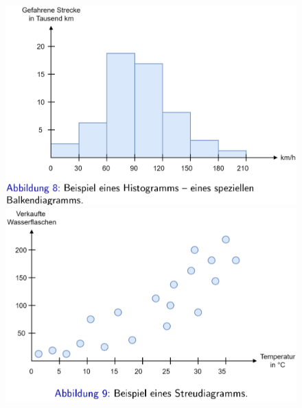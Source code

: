 \documentclass{report}
\begin{document}
  \begin{figure}[H]	
    \centering	
    \begin{minipage}[b]{0.4\textwidth}	
      \includegraphics[scale=.25]{ml01_6}	
    \end{minipage}	
    \hfill	
    \begin{minipage}[b]{0.4\textwidth}	
      \includegraphics[scale=.25]{ml01_7}	
    \end{minipage}	
  \end{figure}	
\end{document}
